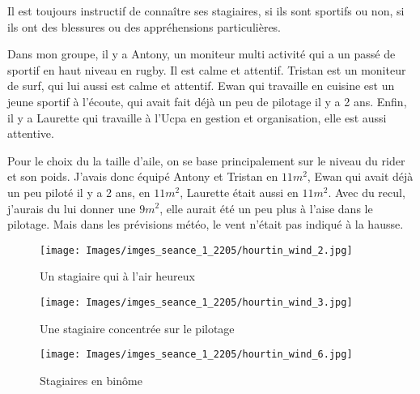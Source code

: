 \documentclass[11pt,a4paper]{report}
\begin{document}
Il est toujours instructif de connaître ses stagiaires, si ils sont 
sportifs ou non, si ils ont des blessures ou des appréhensions particulières.

Dans mon groupe, il y a Antony, un moniteur multi activité qui a un passé 
de sportif en haut niveau en rugby. Il est calme et attentif.
Tristan est un moniteur de surf, qui lui aussi est calme et attentif.
Ewan qui travaille en cuisine est un jeune sportif à l'écoute, qui avait 
fait déjà un peu de pilotage il y a 2 ans.
Enfin, il y a Laurette qui travaille à l'Ucpa en gestion et organisation, elle
est aussi attentive.

Pour le choix du la taille d'aile, on se base principalement sur le niveau du rider 
et son poids. J'avais donc équipé Antony et Tristan en $11 m^2$, Ewan qui avait
déjà un peu piloté il y a 2 ans, en $11 m^2$, Laurette était aussi en $11 m^2$.
Avec du recul, j'aurais du lui donner une  $9 m^2$, elle aurait été un peu plus
à l'aise dans le pilotage. Mais dans les prévisions météo, le vent n'était pas
indiqué à la hausse.

\begin{figure}
\begin{minipage}{0.4\textwidth}
\texttt{[image: Images/imges\_seance\_1\_2205/hourtin\_wind\_2.jpg]} 
\caption{Un stagiaire qui à l'air heureux}
\end{minipage}
\hfill
\begin{minipage}{0.4\textwidth}
\texttt{[image: Images/imges\_seance\_1\_2205/hourtin\_wind\_3.jpg]} 
\caption{Une stagiaire concentrée sur le pilotage}
\end{minipage}
\end{figure}

\begin{figure}
\texttt{[image: Images/imges\_seance\_1\_2205/hourtin\_wind\_6.jpg]}
\caption{Stagiaires en bin\^ome} 
\end{figure}
\end{document}

